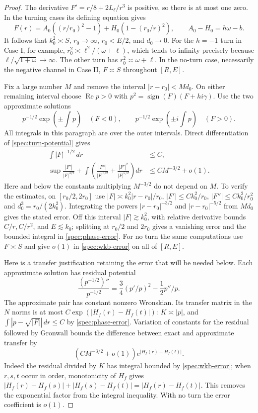\documentclass[11pt]{article}
\numberwithin{equation}{section}
\theoremstyle{definition}
\theoremstyle{remark}
\begin{document}
\begin{proof}
The derivative $F'=r/8+2L_\ell/r^3$ is positive, so there is at most
one zero. In the turning cases its defining equation gives
\begin{equation}\label{spec:turn-potential}
 F(r)=A_0((r/r_0)^2-1)+H_0(1-(r_0/r)^2),\qquad
 A_0-H_0=h\omega-b.
\end{equation}
It follows that $k_0^2\asymp S$, $r_0\to\infty$, $r_0<E/2$, and
$d_0\to0$. For the $h=-1$ turn in Case I, for example,
$r_0^2\asymp \ell^2/(\omega+\ell)$, which tends to infinity precisely
because $\ell/\sqrt{1+\omega}\to\infty$. The other turn has
$r_0^2\asymp\omega+\ell$. In the no-turn case, necessarily the
negative channel in Case II, $F\asymp S$ throughout $[R,E]$.

Fix a large number $M$ and remove the interval $|r-r_0|<Md_0$.
On either remaining interval choose $\operatorname{Re}p>0$ with
$p^2=\operatorname{sign}(F)(F+hi\gamma)$. Use the two approximate
solutions
\[
 p^{-1/2}\exp(\pm\!\int p)\quad(F<0),\qquad
 p^{-1/2}\exp(\pm i\!\int p)\quad(F>0).
\]
All integrals in this paragraph are over the outer intervals. Direct
differentiation of \eqref{spec:turn-potential} gives
\begin{align}
 \int |F|^{-1/2}\,dr&\le C,\label{spec:phase-error}\\
 \sup\frac{|F'|}{|F|^{3/2}}+
 \int\left(\frac{|F''|}{|F|^{3/2}}
       +\frac{|F'|^2}{|F|^{5/2}}\right)dr
 &\le CM^{-3/2}+o(1).\label{spec:wkb-error}
\end{align}
Here and below the constants multiplying $M^{-3/2}$ do not depend on
$M$. To verify the estimates, on $[r_0/2,2r_0]$ use
$|F|\asymp k_0^2|r-r_0|/r_0$,
$|F'|\le Ck_0^2/r_0$, $|F''|\le Ck_0^2/r_0^2$ and
$d_0^3=r_0/(2k_0^2)$. Integrating the powers
$|r-r_0|^{-3/2}$ and $|r-r_0|^{-5/2}$ from $Md_0$ gives the stated
error. Off this interval $|F|\gtrsim k_0^2$, with relative derivative
bounds $C/r,C/r^2$, and $E\lesssim k_0$; splitting at $r_0/2$ and
$2r_0$ gives a vanishing error and the bounded integral in
\eqref{spec:phase-error}. For no turn the same computations use
$F\asymp S$ and give $o(1)$ in \eqref{spec:wkb-error} on all of $[R,E]$.

Here is a transfer justification retaining the error that will be
needed below. Each approximate solution has residual potential
\[
 \frac{(p^{-1/2})''}{p^{-1/2}}
 =\frac34(p'/p)^2-\frac12p''/p.
\]
The approximate pair has constant nonzero Wronskian. Its transfer
matrix in the $N$ norms is at most
$C\exp(|H_f(r)-H_f(t)|)$: $K\asymp|p|$, and
$\int|p-\sqrt{|F|}|\,dr\le C$ by \eqref{spec:phase-error}.
Variation of constants for the residual followed by Gronwall bounds
the difference between exact and approximate transfer by
\begin{equation}\label{spec:transfer-error}
 (CM^{-3/2}+o(1))e^{|H_f(r)-H_f(t)|}.
\end{equation}
Indeed the residual divided by $K$ has integral bounded by
\eqref{spec:wkb-error}; when $r,s,t$ occur in order, monotonicity of
$H_f$ gives
$|H_f(r)-H_f(s)|+|H_f(s)-H_f(t)|=|H_f(r)-H_f(t)|$.
This removes the exponential factor from the integral inequality.
With no turn the error coefficient is $o(1)$.


\end{proof}
\end{document}
